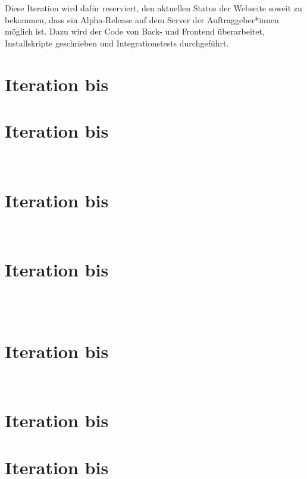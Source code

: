 	Diese Iteration wird dafür reserviert, den aktuellen Status der Webseite soweit zu bekommen, dass ein Alpha-Release auf dem Server der Auftraggeber*innen möglich ist. Dazu wird der Code von Back- und Frontend überarbeitet, Installskripte geschrieben und Integrationstests durchgeführt.

	\section{Iteration bis } %
	

	\section{Iteration bis } %
	\\
	

	\section{Iteration bis } %
	\\
	

	\section{Iteration bis } %
	\\
	\\
	

	\section{Iteration bis } %
	\\
	

	\section{Iteration bis } %


	\section{Iteration bis } %

